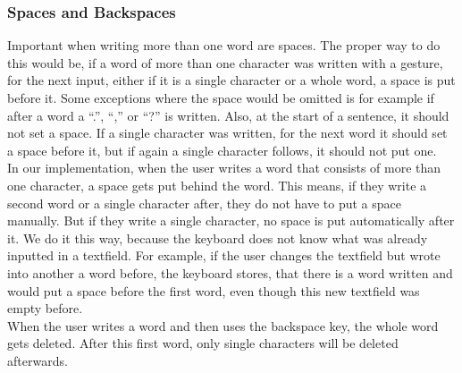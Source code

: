 \subsubsection{Spaces and Backspaces}
Important when writing more than one word are spaces. The proper way to do this would be, if a word of more than one character was written with a gesture, for the next input, either if it is a single character or a whole word, a space is put before it. Some exceptions where the space would be omitted is for example if after a word a ``.'', ``,'' or ``?'' is written. Also, at the start of a sentence, it should not set a space. If a single character was written, for the next word it should set a space before it, but if again a single character follows, it should not put one.\\
In our implementation, when the user writes a word that consists of more than one character, a space gets put behind the word. This means, if they write a second word or a single character after, they do not have to put a space manually. But if they write a single character, no space is put automatically after it. We do it this way, because the keyboard does not know what was already inputted in a textfield. For example, if the user changes the textfield but wrote into another a word before, the keyboard stores, that there is a word written and would put a space before the first word, even though this new textfield was empty before.\\
When the user writes a word and then uses the backspace key, the whole word gets deleted. After this first word, only single characters will be deleted afterwards.

